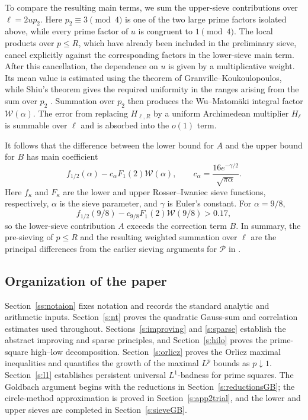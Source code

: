 \documentclass[12pt,reqno]{amsart}
\numberwithin{equation}{section}
\theoremstyle{definition}
\theoremstyle{remark}
\begin{document}
To compare the resulting main terms, we sum the upper-sieve
contributions over \(\ell=2up_2\).  Here \(p_2\equiv3\pmod4\) is one
of the two large prime factors isolated above, while every prime factor
of \(u\) is congruent to \(1\pmod4\).  The local products over \(p\leq R\),
which have already been included in the preliminary sieve, cancel
explicitly against the corresponding factors in the lower-sieve main
term.  After this cancellation, the dependence on \(u\) is given by a
multiplicative weight.  Its mean value is estimated using the theorem
of Granville--Koukoulopoulos, while Shiu's theorem gives the required
uniformity in the ranges arising from the sum over \(p_2\)
\cite{GranvilleKoukoulopoulos,Shiu}.  Summation over \(p_2\) then
produces the Wu--Matom\"aki integral factor \(\mathcal W(\alpha)\).  The error
from replacing \(H_{\ell,R}\) by a uniform Archimedean multiplier \(H_\ell\) is summable over \(\ell\)
and is absorbed into the \(o(1)\) term.

It follows that the difference between the lower bound for \(A\) and
the upper bound for \(B\) has main coefficient
\[
 f_{1/2}(\alpha)
 -c_\alpha F_1(2)\mathcal W(\alpha),
 \qquad
 c_\alpha=\frac{16e^{-\gamma/2}}{\sqrt{\pi\alpha}}.
\]
Here \(f_\kappa\) and \(F_\kappa\) are the lower and upper
Rosser--Iwaniec sieve functions, respectively, \(\alpha\) is the sieve
parameter, and \(\gamma\) is Euler's constant.  For \(\alpha=9/8\),
\[
 f_{1/2}(9/8)
 -c_{9/8}F_1(2)\mathcal W(9/8)>0.17,
\]
so the lower-sieve contribution $A$ exceeds the correction term $B$. In summary, the
pre-sieving of \(p\leq R\) and the resulting weighted summation over
\(\ell\) are the principal differences from the earlier sieving arguments for
\(\mathcal P\) in \cite{W98,Mat07,motamake,Te16}.




\subsection{Organization of the paper}
Section~\ref{ss:notaion} fixes notation and records the standard
analytic and arithmetic inputs. Section~\ref{s:nt} proves the
quadratic Gauss-sum and correlation estimates used throughout.
Sections~\ref{s:improving} and \ref{s:sparse} establish the abstract
improving and sparse principles, and Section~\ref{s:hilo} proves the
prime-square high--low decomposition.
Section~\ref{s:orlicz} proves the Orlicz maximal inequalities and
quantifies the growth of the maximal \(L^p\) bounds as
\(p\downarrow1\). Section~\ref{s:l1} establishes persistent universal
\(L^1\)-badness for prime squares.
The Goldbach argument begins with the reductions in
Section~\ref{s:reductionsGB}; the circle-method approximation is
proved in Section~\ref{s:app2trial}, and the lower and upper sieves
are completed in Section~\ref{s:sieveGB}.
\end{document}
